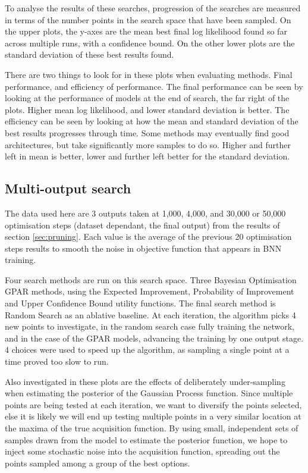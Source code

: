 To analyse the results of these searches, progression of the searches are measured in terms of the number points in the search space that have been sampled. On the upper plots, the y-axes are the mean best final log likelihood found so far across multiple runs, with a confidence bound. On the other lower plots are the standard deviation of these best results found.

There are two things to look for in these plots when evaluating methods. Final performance, and efficiency of performance. The final performance can be seen by looking at the performance of models at the end of search, the far right of the plots. Higher mean log likelihood, and lower standard deviation is better. The efficiency can be seen by looking at how the mean and standard deviation of the best results progresses through time. Some methods may eventually find good architectures, but take significantly more samples to do so. Higher and further left in mean is better, lower and further left better for the standard deviation.

\subsection{Multi-output search}

The data used here are 3 outputs taken at 1,000, 4,000, and 30,000 or 50,000 optimisation steps (dataset dependant, the final output) from the results of section \ref{sec:pruning}. Each value is the average of the previous 20 optimisation steps results to smooth the noise in objective function that appears in BNN training.

Four search methods are run on this search space. Three Bayesian Optimisation GPAR methods, using the Expected Improvement, Probability of Improvement and Upper Confidence Bound utility functions. The final search method is Random Search as an ablative baseline. At each iteration, the algorithm picks 4 new points to investigate, in the random search case fully training the network, and in the case of the GPAR models, advancing the training by one output stage. 4 choices were used to speed up the algorithm, as sampling a single point at a time proved too slow to run. 

Also investigated in these plots are the effects of deliberately under-sampling when estimating the posterior of the Gaussian Process function. Since multiple points are being tested at each iteration, we want to diversify the points selected, else it is likely we will end up testing multiple points in a very similar location at the maxima of the true acquisition function. By using small, independent sets of samples drawn from the model to estimate the posterior function, we hope to inject some stochastic noise into the acquisition function, spreading out the points sampled among a group of the best options. 

